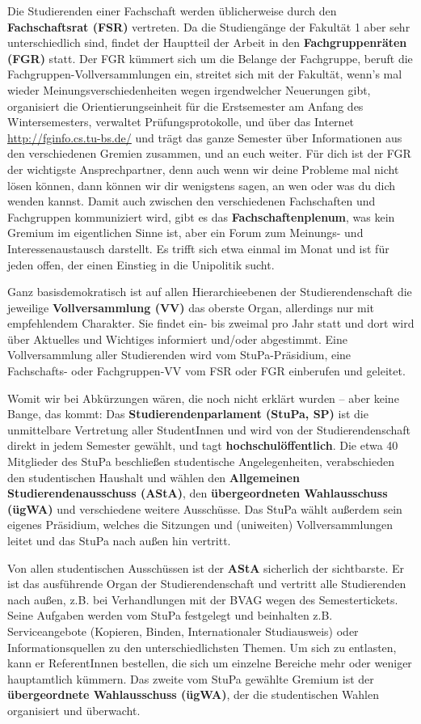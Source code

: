 		Die Studierenden einer Fachschaft werden üblicherweise durch den \textbf{Fachschaftsrat (FSR)} vertreten. Da die Studiengänge der Fakultät 1 aber sehr unterschiedlich sind, findet der Hauptteil der Arbeit in den \textbf{Fachgruppenräten (FGR)} statt. Der FGR kümmert sich um die Belange der Fachgruppe, beruft die Fachgruppen-Vollversammlungen ein, streitet sich mit der Fakultät, wenn's mal wieder Meinungsverschiedenheiten wegen irgendwelcher Neuerungen gibt, organisiert die Orientierungseinheit für die Erstsemester am Anfang des Wintersemesters, verwaltet Prüfungsprotokolle, und über das Internet \url{http://fginfo.cs.tu-bs.de/} und trägt das ganze Semester über Informationen aus den verschiedenen Gremien zusammen, und an euch weiter. Für dich ist der FGR der wichtigste Ansprechpartner, denn auch wenn wir deine Probleme mal nicht lösen können, dann können wir dir wenigstens sagen, an wen oder was du dich wenden kannst. Damit auch zwischen den verschiedenen Fachschaften und Fachgruppen kommuniziert wird, gibt es das \textbf{Fachschaftenplenum}, was kein Gremium im eigentlichen Sinne ist, aber ein Forum zum Meinungs- und Interessenaustausch darstellt. Es trifft sich etwa einmal im Monat und ist für jeden offen, der einen Einstieg in die Unipolitik sucht.

		Ganz basisdemokratisch ist auf allen Hierarchie\-ebenen der Studierendenschaft die jeweilige \textbf{Vollversammlung (VV)} das oberste Organ, allerdings nur mit empfehlendem Charakter. Sie findet ein- bis zweimal pro Jahr statt und dort wird über Aktuelles und Wichtiges informiert und/oder abgestimmt. Eine Vollversammlung aller Studierenden wird vom StuPa-Präsidium, eine Fachschafts- oder Fachgruppen-VV vom FSR oder FGR einberufen und geleitet.

		Womit wir bei Abkürzungen wären, die noch nicht erklärt wurden -- aber keine Bange, das kommt: Das \textbf{Studierendenparlament (StuPa, SP)} ist die unmittelbare Vertretung aller StudentInnen und wird von der Studierendenschaft direkt in jedem Semester gewählt, und tagt \textbf{hochschulöffentlich}. Die etwa 40 Mitglieder des StuPa beschließen studentische Angelegenheiten, verabschieden den studentischen Haushalt und wählen den \textbf{Allgemeinen Studierendenausschuss (AStA)}, den \textbf{übergeordneten Wahlausschuss (ügWA)} und verschiedene weitere Ausschüsse. Das StuPa wählt außerdem sein eigenes Präsidium, welches die Sitzungen und (uniweiten) Vollversammlungen leitet und das StuPa nach außen hin vertritt.

		Von allen studentischen Ausschüssen ist der \textbf{AStA} sicherlich der sichtbarste. Er ist das ausführende Organ der Studierendenschaft und vertritt alle Studierenden nach außen, z.B. bei Verhandlungen mit der BVAG wegen des Semestertickets. Seine Aufgaben werden vom StuPa festgelegt und beinhalten z.B. Serviceangebote (Kopieren, Binden, Internationaler Studiausweis) oder Informationsquellen zu den unterschiedlichsten Themen. Um sich zu entlasten, kann er ReferentInnen bestellen, die sich um einzelne Bereiche mehr oder weniger hauptamtlich kümmern. Das zweite vom StuPa gewählte Gremium ist der \textbf{übergeordnete Wahlausschuss (ügWA)}, der die studentischen Wahlen organisiert und überwacht.

